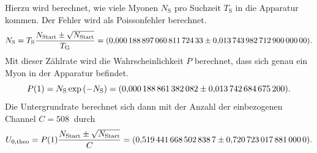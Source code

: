 Hierzu wird berechnet, wie viele Myonen $N_{\text{S}}$ pro Suchzeit $T_{\text{S}}$ in die Apparatur kommen. Der Fehler wird als Poissonfehler berechnet.
\begin{equation*}
  N_{\text{S}} = T_{\text{S}}\frac{N_{\text{Start}} \pm \sqrt{ N_{\text{Start}}} }{T_{\text{G}}} = \SI{0.00018889706081172433 \pm 0.0137439827129}{}.
\end{equation*}
Mit dieser Zählrate wird die Wahrscheinlichkeit $P$ berechnet, dass sich genau ein Myon in der Apparatur befindet.
\begin{equation*}
  P(1) = N_{\text{S}} \exp{(-N_{\text{S}})} = \SI{0.000188861382082 \pm 0.0137426846752}{}.
\end{equation*}
Die Untergrundrate berechnet sich dann mit der Anzahl der einbezogenen Channel $C=\SI{508}{}$ durch
\begin{equation*}
  U_{\text{0,theo}}= P(1) \frac{ N_{\text{Start}} \pm \sqrt{ N_{\text{Start}} }}{C} = \SI{0.5194416685028387 \pm 0.720723017881}{}.
\end{equation*}
\FloatBarrier
